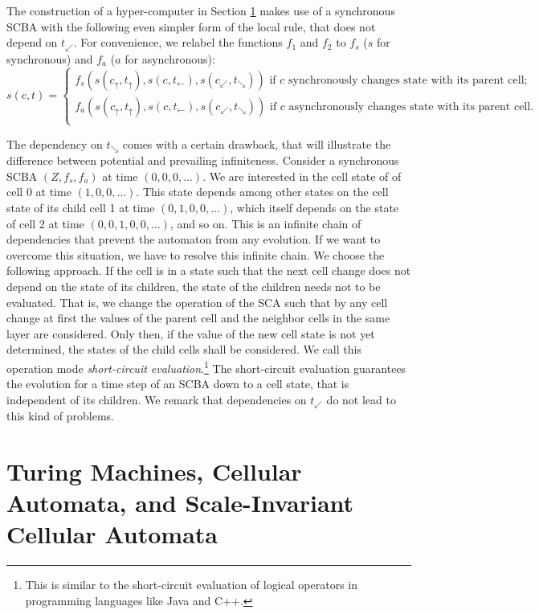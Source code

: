 \documentclass[pre,amssymb,showpacs,showkeys,preprint]{revtex4}
\begin{document}
The construction of a hyper-computer in Section \ref{sec:tm-ca-sca} makes use of a synchronous
SCBA with the following even simpler form of the local rule, that
does not depend on $t_\swarrow$.
For convenience, we relabel the functions $f_1$ and $f_2$ to $f_s$ ($s$ for synchronous) and $f_a$
($a$ for asynchronous):
\[
s(c,t) = \left\{
\begin{array}{l}
f_{s}(
	s(c_\uparrow, t_\uparrow),
	s(c, t_\leftarrow),
	s(c_\swarrow, t_\searrow)
) \mbox{  if $c$ synchronously changes state with its parent cell;} \\
f_{a}(
	s(c_\uparrow, t_\uparrow),
	s(c, t_\leftarrow),
	s(c_\swarrow, t_\searrow)
) \mbox{  if $c$ asynchronously changes state with its parent cell.} \\
\end{array}
\right.
\]

The dependency on $t_\searrow$ comes with a certain drawback, that will illustrate the difference
between potential and prevailing infiniteness.
Consider a synchronous SCBA $(Z, f_s, f_a)$ at time $(0, 0, 0, \ldots)$.
We are interested in the cell state of of cell 0 at time $(1, 0, 0, \ldots)$.
This state depends among other states on the cell state of its child cell 1 at time
$(0, 1, 0, 0, \ldots)$, which itself depends on the state of cell 2 at time
$(0, 0, 1, 0, 0, \ldots)$, and so on.
This is an infinite chain of dependencies that prevent the automaton from any evolution.
If we want to overcome this situation, we have to resolve this infinite chain.
We choose the following approach.
If the cell is in a state such that the next cell change does not depend on the state of its children,
the state of the children needs not to be evaluated.
That is, we change the operation of the SCA such that by any cell change at first the values of
the parent cell and the neighbor cells in the same layer are considered.
Only then, if the value of the new cell state is not yet determined, the states of the
child cells shall be considered.
We call this operation mode \emph{short-circuit evaluation}.\footnote{This is similar to the
short-circuit evaluation of logical operators in programming languages like Java and C++.}
The short-circuit evaluation guarantees the evolution for a time step of an SCBA down to a cell state,
that is independent of its children.
We remark that dependencies on $t_\swarrow$ do not lead to this kind of problems.


\section{Turing Machines, Cellular Automata, and Scale-Invariant Cellular Automata}
\label{sec:tm-ca-sca}
\end{document}
